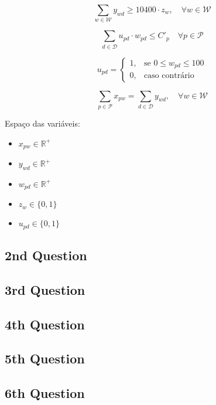 \documentclass[12pt,a4paper]{article}
\begin{document}
\begin{equation} %
    \sum_{w \in \mathcal{W}} y_{wd}
    \geq 10400 \cdot z_{w}, \quad
    \forall w \in \mathcal{W}
\end{equation}


\begin{equation} %
    \sum_{d \in \mathcal{D}} u_{pd} \cdot w_{pd} \leq C'_p \quad \forall p \in \mathcal{P}
\end{equation}

\begin{equation}%
    u_{pd} =
    \begin{cases}
        1, & \text{se } 0 \leq w_{pd} \leq 100 \\
        0, & \text{caso contrário}
    \end{cases}
\end{equation}


\begin{equation} %
    \sum_{p \in \mathcal{P}} x_{pw} =
    \sum_{d \in \mathcal{D}} y_{wd}, \quad
    \forall w \in \mathcal{W}
\end{equation}

Espaço das variáveis:

\begin{itemize}
    \item $x_{pw} \in \mathbb{R}^+$
    \item $y_{wd} \in \mathbb{R}^+$
    \item $w_{pd} \in \mathbb{R}^+$
    \item $z_{w} \in \{0, 1\}$
    \item $u_{pd} \in \{0, 1\}$
\end{itemize}




\subsection{2nd Question}


\subsection{3rd Question}


\subsection{4th Question}


\subsection{5th Question}


\subsection{6th Question}
\end{document}
